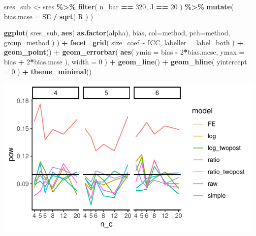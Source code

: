 \documentclass[
]{book}
\newenvironment{Shaded}{\begin{snugshade}}{\end{snugshade}}
\newcommand{\AttributeTok}[1]{\textcolor[rgb]{0.13,0.29,0.53}{#1}}
\newcommand{\DecValTok}[1]{\textcolor[rgb]{0.00,0.00,0.81}{#1}}
\newcommand{\FunctionTok}[1]{\textcolor[rgb]{0.13,0.29,0.53}{\textbf{#1}}}
\newcommand{\NormalTok}[1]{#1}
\newcommand{\OtherTok}[1]{\textcolor[rgb]{0.56,0.35,0.01}{#1}}
\newcommand{\SpecialCharTok}[1]{\textcolor[rgb]{0.81,0.36,0.00}{\textbf{#1}}}
\begin{document}
\begin{Shaded}
\begin{Highlighting}[]
\NormalTok{sres\_sub }\OtherTok{\textless{}{-}} 
\NormalTok{  sres }\SpecialCharTok{\%\textgreater{}\%}
  \FunctionTok{filter}\NormalTok{( n\_bar }\SpecialCharTok{==} \DecValTok{320}\NormalTok{, J }\SpecialCharTok{==} \DecValTok{20}\NormalTok{ ) }\SpecialCharTok{\%\textgreater{}\%}
  \FunctionTok{mutate}\NormalTok{( }\AttributeTok{bias.mcse =}\NormalTok{ SE }\SpecialCharTok{/} \FunctionTok{sqrt}\NormalTok{( R ) )}

\FunctionTok{ggplot}\NormalTok{( sres\_sub, }\FunctionTok{aes}\NormalTok{( }\FunctionTok{as.factor}\NormalTok{(alpha), bias, }
                       \AttributeTok{col=}\NormalTok{method, }\AttributeTok{pch=}\NormalTok{method, }\AttributeTok{group=}\NormalTok{method ) ) }\SpecialCharTok{+}
  \FunctionTok{facet\_grid}\NormalTok{( size\_coef }\SpecialCharTok{\textasciitilde{}}\NormalTok{ ICC, }\AttributeTok{labeller =}\NormalTok{ label\_both ) }\SpecialCharTok{+}
  \FunctionTok{geom\_point}\NormalTok{() }\SpecialCharTok{+} 
  \FunctionTok{geom\_errorbar}\NormalTok{( }\FunctionTok{aes}\NormalTok{( }\AttributeTok{ymin =}\NormalTok{ bias }\SpecialCharTok{{-}} \DecValTok{2}\SpecialCharTok{*}\NormalTok{bias.mcse, }
                      \AttributeTok{ymax =}\NormalTok{ bias }\SpecialCharTok{+} \DecValTok{2}\SpecialCharTok{*}\NormalTok{bias.mcse ), }
                 \AttributeTok{width =} \DecValTok{0}\NormalTok{ ) }\SpecialCharTok{+}
  \FunctionTok{geom\_line}\NormalTok{() }\SpecialCharTok{+}
  \FunctionTok{geom\_hline}\NormalTok{( }\AttributeTok{yintercept =} \DecValTok{0}\NormalTok{ ) }\SpecialCharTok{+}
  \FunctionTok{theme\_minimal}\NormalTok{() }
\end{Highlighting}
\end{Shaded}

\begin{center}\includegraphics[width=0.75\linewidth]{Designing-Simulations-in-R_files/figure-latex/unnamed-chunk-261-1} \end{center}
\end{document}
